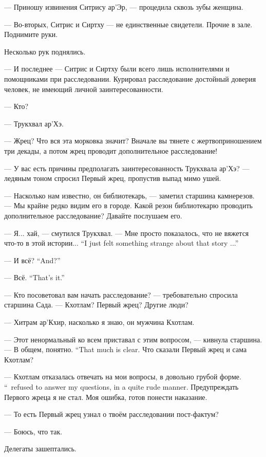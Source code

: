 --- Приношу извинения Ситрису ар'Эр, --- процедила сквозь зубы женщина.

--- Во-вторых, Ситрис и Сиртху --- не единственные свидетели.
Прочие в зале.
Поднимите руки.

Несколько рук поднялись.

--- И последнее --- Ситрис и Сиртху были всего лишь исполнителями и помощниками при расследовании.
Курировал расследование достойный доверия человек, не имеющий личной заинтересованности.

--- Кто?

--- Трукхвал ар'Хэ.

--- Жрец?
Что вся эта морковка значит?
Вначале вы тянете с жертвоприношением три декады, а потом жрец проводит дополнительное расследование!

--- У вас есть причины предполагать заинтересованность Трукхвала ар'Хэ? --- ледяным тоном спросил Первый жрец, пропустив выпад мимо ушей.

--- Насколько нам известно, он библиотекарь, --- заметил старшина камнерезов.
--- Мы крайне редко видим его в городе.
Какой резон библиотекарю проводить дополнительное расследование?
Давайте послушаем его.

--- Я... хай, --- смутился Трукхвал.
{--- Мне просто показалось, что не вяжется что-то в этой истории...}
{``I just felt something strange about that story ...''}

{--- И всё?}
{``And?''}

{--- Всё.}
{``That's it.''}

--- Кто посоветовал вам начать расследование? --- требовательно спросила старшина Сада.
--- Кхотлам?
Первый жрец?
Другие люди?

--- Хитрам ар'Кхир, насколько я знаю, он мужчина Кхотлам.

--- Этот ненормальный ко всем приставал с этим вопросом, --- кивнула старшина.
{--- В общем, понятно.}
{``That much is clear.}
Что сказали Первый жрец и сама Кхотлам?

{--- Кхотлам отказалась отвечать на мои вопросы, в довольно грубой форме.}
{``\Kchotlam\ refused to answer my questions, in a quite rude manner.}
Предупреждать Первого жреца я не стал.
Моя ошибка, готов понести наказание.

--- То есть Первый жрец узнал о твоём расследовании пост-фактум?

--- Боюсь, что так.

Делегаты зашептались.

